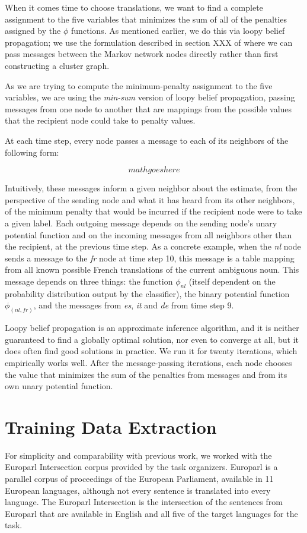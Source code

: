 \documentclass[11pt,letterpaper]{article}
\begin{document}
When it comes time to choose translations, we want to find a complete
assignment to the five variables that minimizes the sum of all of the penalties
assigned by the $\phi$ functions. As mentioned earlier, we do this via loopy
belief propagation; we use the formulation described in section XXX of
\cite{Koller+Friedman:09} where we can pass messages between the Markov network
nodes directly rather than first constructing a cluster graph.

As we are trying to compute the minimum-penalty assignment to the five
variables, we are using the \emph{min-sum} version of loopy belief propagation,
passing messages from one node to another that are mappings from the possible
values that the recipient node could take to penalty values.

At each time step, every node passes a message to each of its neighbors of the
following form:

$$
mathgoeshere
$$

Intuitively, these messages inform a given neighbor about the estimate, from
the perspective of the sending node and what it has heard from its other
neighbors, of the minimum penalty that would be incurred if the recipient node
were to take a given label. Each outgoing message depends on the sending node's
unary potential function and on the incoming messages from all neighbors other
than the recipient, at the previous time step. As a concrete example, when the
\emph{nl} node sends a message to the \emph{fr} node at time step 10, this
message is a table mapping from all known possible French translations of
the current ambiguous noun. This message depends on three things: the function
$\phi_{nl}$ (itself dependent on the probability distribution output by the
classifier), the binary potential function $\phi_{(nl,fr)}$, and the messages
from \emph{es}, \emph{it} and \emph{de} from time step 9. 

Loopy belief propagation is an approximate inference algorithm, and it is
neither guaranteed to find a globally optimal solution, nor even to converge at
all, but it does often find good solutions in practice. We run it for twenty
iterations, which empirically works well. After the message-passing iterations,
each node chooses the value that minimizes the sum of the penalties from
messages and from its own unary potential function.

\section{Training Data Extraction}
\label{extraction}
For simplicity and comparability with previous work, we worked with the
Europarl Intersection corpus provided by the task organizers. Europarl
\cite{europarl} is a parallel corpus of proceedings of the European Parliament,
available in 11 European languages, although not every sentence is translated
into every language. The Europarl Intersection is the intersection of the
sentences from Europarl that are available in English and all five of the
target languages for the task.
\end{document}
